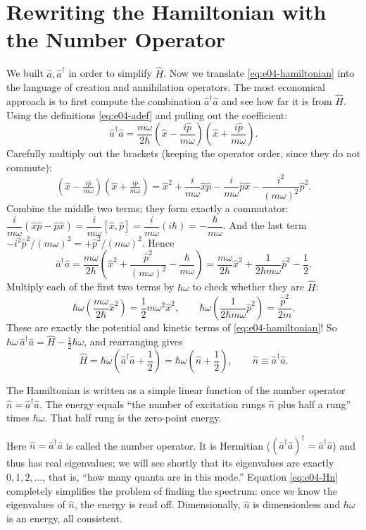\section{Rewriting the Hamiltonian with the Number Operator}
\label{sec:e04-numberH}

We built \(\hat a,\hat a^\dagger\) in order to simplify \(\hat H\). Now we translate \eqref{eq:e04-hamiltonian} into the language of creation and annihilation operators. The most economical approach is to first compute the combination \(\hat a^\dagger\hat a\) and see how far it is from \(\hat H\). Using the definitions \eqref{eq:e04-adef} and pulling out the coefficient:
\[
  \hat a^\dagger\hat a
  =\frac{m\omega}{2\hbar}
  \left(\hat x-\frac{i\hat p}{m\omega}\right)\!\left(\hat x+\frac{i\hat p}{m\omega}\right).
\]
Carefully multiply out the brackets (keeping the operator order, since they do not commute):
\[
  \left(\hat x-\tfrac{i\hat p}{m\omega}\right)\!\left(\hat x+\tfrac{i\hat p}{m\omega}\right)
  =\hat x^2+\frac{i}{m\omega}\hat x\hat p-\frac{i}{m\omega}\hat p\hat x-\frac{i^2}{(m\omega)^2}\hat p^2 .
\]
Combine the middle two terms; they form exactly a commutator: \(\dfrac{i}{m\omega}(\hat x\hat p-\hat p\hat x)=\dfrac{i}{m\omega}[\hat x,\hat p]=\dfrac{i}{m\omega}(i\hbar)=-\dfrac{\hbar}{m\omega}\). And the last term \(-i^2\hat p^2/(m\omega)^2=+\hat p^2/(m\omega)^2\). Hence
\[
  \hat a^\dagger\hat a
  =\frac{m\omega}{2\hbar}
  \left(\hat x^2+\frac{\hat p^2}{(m\omega)^2}-\frac{\hbar}{m\omega}\right)
  =\frac{m\omega}{2\hbar}\hat x^2+\frac{1}{2\hbar m\omega}\hat p^2-\frac12 .
\]
Multiply each of the first two terms by \(\hbar\omega\) to check whether they are \(\hat H\):
\[
  \hbar\omega\left(\frac{m\omega}{2\hbar}\hat x^2\right)=\frac12 m\omega^2\hat x^2,
  \qquad
  \hbar\omega\left(\frac{1}{2\hbar m\omega}\hat p^2\right)=\frac{\hat p^2}{2m}.
\]
These are exactly the potential and kinetic terms of \eqref{eq:e04-hamiltonian}! So \(\hbar\omega\,\hat a^\dagger\hat a=\hat H-\tfrac12\hbar\omega\), and rearranging gives
\begin{equation}
  \hat H=\hbar\omega\left(\hat a^\dagger\hat a+\frac12\right)
        =\hbar\omega\left(\hat n+\frac12\right),
  \qquad \hat n\equiv\hat a^\dagger\hat a .
  \label{eq:e04-Hn}
\end{equation}
\begin{formulaexplain}
The Hamiltonian is written as a simple linear function of the number operator \(\hat n=\hat a^\dagger\hat a\). The energy equals ``the number of excitation rungs \(\hat n\) plus half a rung'' times \(\hbar\omega\). That half rung is the zero-point energy.
\end{formulaexplain}
Here \(\hat n=\hat a^\dagger\hat a\) is called the number operator. It is Hermitian (\((\hat a^\dagger\hat a)^\dagger=\hat a^\dagger\hat a\)) and thus has real eigenvalues; we will see shortly that its eigenvalues are exactly \(0,1,2,\ldots\), that is, ``how many quanta are in this mode.'' Equation \eqref{eq:e04-Hn} completely simplifies the problem of finding the spectrum: once we know the eigenvalues of \(\hat n\), the energy is read off. Dimensionally, \(\hat n\) is dimensionless and \(\hbar\omega\) is an energy, all consistent.

